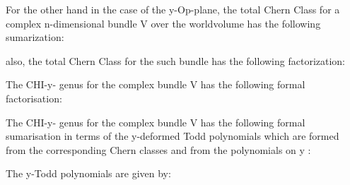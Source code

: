 \documentclass[a4paper,a4paper]{article}
\begin{document}
For the other hand in the case of the y-Op-plane, the total Chern Class for a  complex n-dimensional bundle V over the worldvolume has the following sumarization:
\begin{center}
{  \coordHE{} }
\end{center} 
also, the total Chern Class for the such bundle has the following factorization:

\begin{center}
{  \coordHE{} }
\end{center}
The  CHI-y- genus for the complex bundle V has the following formal factorisation:
\begin{center}
{  \coordHE{} }
\end{center}

The CHI-y- genus for the complex bundle V has the following formal sumarisation in terms of the y-deformed Todd polynomials which are formed from the corresponding Chern classes and from the polynomials on y :
\begin{center}
{  \coordHE{} }
\end{center}

The y-Todd  polynomials are given by:
\begin{center}
{  \coordHE{} }
\end{center}
\begin{center}
{  \coordHE{} }
\end{center}
\begin{center}
{  \coordHE{} }
\end{center}
\begin{center}
{  \coordHE{} }
\end{center}
\begin{center}
{  \coordHE{} }
\end{center}
\end{document}
